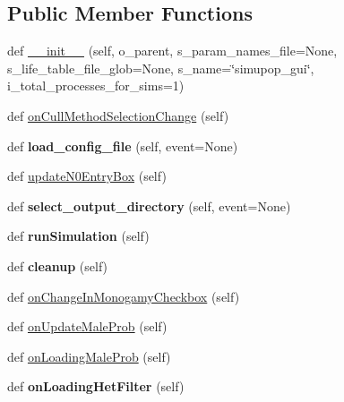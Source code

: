 \subsection*{Public Member Functions}
\begin{DoxyCompactItemize}
\item 
def \hyperlink{classnegui_1_1pgguisimupop__experimental2_1_1PGGuiSimuPop_a893bcb98c446d8557f353cde25edd6c7}{\+\_\+\+\_\+init\+\_\+\+\_\+} (self, o\+\_\+parent, s\+\_\+param\+\_\+names\+\_\+file=None, s\+\_\+life\+\_\+table\+\_\+file\+\_\+glob=None, s\+\_\+name=\char`\"{}simupop\+\_\+gui\char`\"{}, i\+\_\+total\+\_\+processes\+\_\+for\+\_\+sims=1)
\item 
def \hyperlink{classnegui_1_1pgguisimupop__experimental2_1_1PGGuiSimuPop_a11cf5050ac71b9585050e6b795eb9ce6}{on\+Cull\+Method\+Selection\+Change} (self)
\item 
def {\bfseries load\+\_\+config\+\_\+file} (self, event=None)\hypertarget{classnegui_1_1pgguisimupop__experimental2_1_1PGGuiSimuPop_adcfcf4b1fe2703e11bd086f604f04d98}{}\label{classnegui_1_1pgguisimupop__experimental2_1_1PGGuiSimuPop_adcfcf4b1fe2703e11bd086f604f04d98}

\item 
def \hyperlink{classnegui_1_1pgguisimupop__experimental2_1_1PGGuiSimuPop_ac06966a637e67a0e40721510eb36c353}{update\+N0\+Entry\+Box} (self)
\item 
def {\bfseries select\+\_\+output\+\_\+directory} (self, event=None)\hypertarget{classnegui_1_1pgguisimupop__experimental2_1_1PGGuiSimuPop_a6e1f86c885c819bdbbaeb7808e917cad}{}\label{classnegui_1_1pgguisimupop__experimental2_1_1PGGuiSimuPop_a6e1f86c885c819bdbbaeb7808e917cad}

\item 
def {\bfseries run\+Simulation} (self)\hypertarget{classnegui_1_1pgguisimupop__experimental2_1_1PGGuiSimuPop_a02eb92b847156660b66d92e68551b3cb}{}\label{classnegui_1_1pgguisimupop__experimental2_1_1PGGuiSimuPop_a02eb92b847156660b66d92e68551b3cb}

\item 
def {\bfseries cleanup} (self)\hypertarget{classnegui_1_1pgguisimupop__experimental2_1_1PGGuiSimuPop_a66088e71040b308e60d2e0d3e787d67a}{}\label{classnegui_1_1pgguisimupop__experimental2_1_1PGGuiSimuPop_a66088e71040b308e60d2e0d3e787d67a}

\item 
def \hyperlink{classnegui_1_1pgguisimupop__experimental2_1_1PGGuiSimuPop_a4007d53cf7618a9d75ea585d31e880a6}{on\+Change\+In\+Monogamy\+Checkbox} (self)
\item 
def \hyperlink{classnegui_1_1pgguisimupop__experimental2_1_1PGGuiSimuPop_abca8d95421cefa86b821648f4651af36}{on\+Update\+Male\+Prob} (self)
\item 
def \hyperlink{classnegui_1_1pgguisimupop__experimental2_1_1PGGuiSimuPop_a19bd49cf3fa3b2e37660992fff97daee}{on\+Loading\+Male\+Prob} (self)
\item 
def {\bfseries on\+Loading\+Het\+Filter} (self)\hypertarget{classnegui_1_1pgguisimupop__experimental2_1_1PGGuiSimuPop_a73d2fcb07eb4dc92b6ebc3d1e4ed77ef}{}\label{classnegui_1_1pgguisimupop__experimental2_1_1PGGuiSimuPop_a73d2fcb07eb4dc92b6ebc3d1e4ed77ef}


\end{DoxyCompactItemize}
